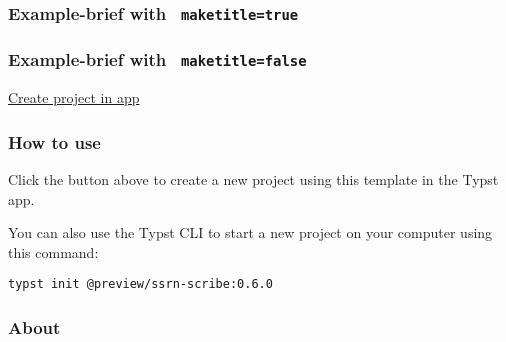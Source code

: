 \subsubsection{\texorpdfstring{Example-brief with
\texttt{\ maketitle=true\ }}{Example-brief with  maketitle=true }}\label{example-brief-with-maketitletrue}


\subsubsection{\texorpdfstring{Example-brief with
\texttt{\ maketitle=false\ }}{Example-brief with  maketitle=false }}\label{example-brief-with-maketitlefalse}


\href{/app?template=ssrn-scribe&version=0.6.0}{Create project in app}

\subsubsection{How to use}\label{how-to-use-1}

Click the button above to create a new project using this template in
the Typst app.

You can also use the Typst CLI to start a new project on your computer
using this command:

\begin{verbatim}
typst init @preview/ssrn-scribe:0.6.0
\end{verbatim}



\subsubsection{About}\label{about}

